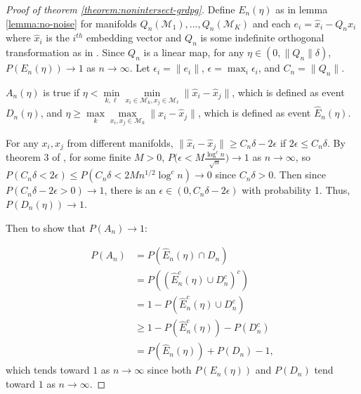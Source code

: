 \documentclass[
  12pt,
]{article}
\theoremstyle{definition}
\theoremstyle{definition}
\theoremstyle{definition}
\theoremstyle{definition}
\theoremstyle{remark}
\begin{document}
\begin{proof}[Proof of theorem \ref{theorem:nonintersect-grdpg}]
Define $E_n(\eta)$ as in lemma \ref{lemma:no-noise} for manifolds $Q_n(\mathcal{M}_1), ..., Q_n(\mathcal{M}_K)$ and each $e_i = \hat{x}_i - Q_n x_i$ where $\hat{x}_i$ is the $i^{th}$ embedding vector and $Q_n$ is some indefinite orthogonal transformation as in \citet{rubindelanchy2017statistical}. 
Since $Q_n$ is a linear map, for any $\eta \in (0, \|Q_n\| \delta)$, $P(E_n(\eta)) \to 1$ as $n \to \infty$. 
Let $\epsilon_i = \|e_i\|$, $\epsilon = \max_i \epsilon_i$, and $C_n = \|Q_n\|$. 

$A_n(\eta)$ is true if $\eta < \min\limits_{k, \ell} \min\limits_{x_i \in \mathcal{M}_k, x_j \in \mathcal{M}_\ell} \|\hat{x}_i - \hat{x}_j\|$, which is defined as event $D_n(\eta)$, and $\eta \geq \max\limits_k \max\limits_{x_i, x_j \in \mathcal{M}_k} \|\hat{x}_i - \hat{x}_j\|$, which is defined as event $\hat{E}_n(\eta)$.

For any $x_i, x_j$ from different manifolds, $\|\hat{x}_i - \hat{x}_j\| \geq C_n \delta - 2 \epsilon$ if $2 \epsilon \leq C_n \delta$. 
By theorem 3 of \citet{rubindelanchy2017statistical}, for some finite $M > 0$, $P \big(\epsilon < M \frac{\log^c n}{\sqrt{n}} \big) \to 1$ as $n \to \infty$, so $P(C_n \delta < 2 \epsilon) \leq P(C_n \delta < 2 M n^{1/2} \log^c n) \to 0$ since $C_n \delta > 0$. 
Then since $P(C_n \delta - 2 \epsilon > 0) \to 1$, there is an $\epsilon \in (0, C_n \delta - 2 \epsilon)$ with probability 1. 
Thus, $P(D_n(\eta)) \to 1$. 

Then to show that $P(A_n) \to 1$: 

$$
\begin{aligned}
P(A_n) & = P(\hat{E}_n(\eta) \cap D_n) \\
& = P((\hat{E}_n^c(\eta) \cup D_n^c)^c) \\
& = 1 - P(\hat{E}_n^c(\eta) \cup D_n^c) \\
& \geq 1 - P(\hat{E}_n^c(\eta)) - P(D_n^c) \\ 
& = P(\hat{E}_n(\eta)) + P(D_n) - 1,
\end{aligned}
$$
which tends toward $1$ as $n \to \infty$ since both $P(E_n(\eta))$ and $P(D_n)$ tend toward $1$ as $n \to \infty$. 
\end{proof}
\end{document}
